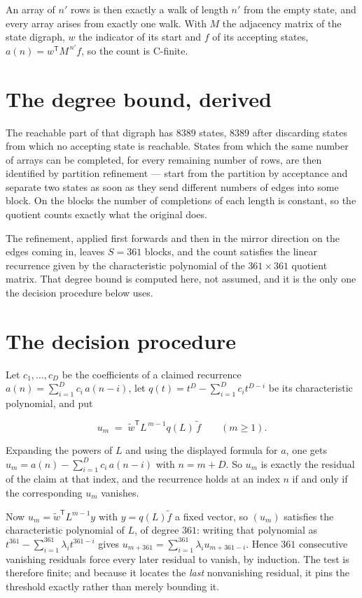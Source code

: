 \documentclass[11pt]{article}
\theoremstyle{definition}
\begin{document}
An array of $n'$ rows is then exactly a walk of length $n'$ from the empty state, and every array arises from exactly one walk. With $M$ the adjacency matrix of the state digraph, $w$ the indicator of its start and $f$ of its accepting states, $a(n) = w^{\mathsf T}M^{\,n'}f$, so the count is C-finite.

\section{The degree bound, derived}

The reachable part of that digraph has $8389$ states, $8389$ after discarding states from which no accepting state is reachable. States from which the same number of arrays can be completed, for every remaining number of rows, are then identified by partition refinement --- start from the partition by acceptance and separate two states as soon as they send different numbers of edges into some block. On the blocks the number of completions of each length is constant, so the quotient counts exactly what the original does.

The refinement, applied first forwards and then in the mirror direction on the edges coming in, leaves $S = 361$ blocks, and the count satisfies the linear recurrence given by the characteristic polynomial of the $361 \times 361$ quotient matrix. That degree bound is computed here, not assumed, and it is the only one the decision procedure below uses.

\section{The decision procedure}

Let $c_1,\dots,c_D$ be the coefficients of a claimed recurrence $a(n) = \sum_{i=1}^{D} c_i\,a(n-i)$, let $q(t) = t^{D} - \sum_{i=1}^{D} c_i t^{D-i}$ be its characteristic polynomial, and put

\[u_m \;=\; \tilde w^{\mathsf T} L^{\,m-1} q(L)\,\tilde f \qquad (m \ge 1).\]

Expanding the powers of $L$ and using the displayed formula for $a$, one gets $u_m = a(n) - \sum_{i=1}^{D} c_i\,a(n-i)$ with $n = m + D$. So $u_m$ is exactly the residual of the claim at that index, and the recurrence holds at an index $n$ if and only if the corresponding $u_m$ vanishes.

Now $u_m = \tilde w^{\mathsf T} L^{m-1} y$ with $y = q(L)\tilde f$ a fixed vector, so $(u_m)$ satisfies the characteristic polynomial of $L$, of degree $361$: writing that polynomial as $t^{361} - \sum_{i=1}^{361} \lambda_i t^{361-i}$ gives $u_{m+361} = \sum_{i=1}^{361} \lambda_i u_{m+361-i}$. Hence $361$ consecutive vanishing residuals force every later residual to vanish, by induction. The test is therefore finite; and because it locates the {\itshape last} nonvanishing residual, it pins the threshold exactly rather than merely bounding it.
\end{document}
